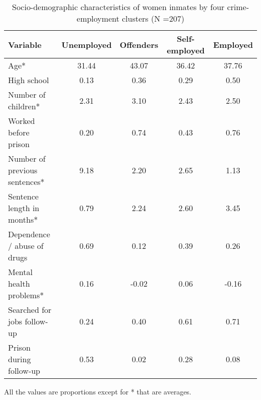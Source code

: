 \begin{table}[htp]
\footnotesize
\setlength{\tabcolsep}{10pt}
\renewcommand{\arraystretch}{1.3}
\begin{threeparttable}
\centering
\caption{Socio-demographic characteristics of women inmates \newline by four crime-employment clusters (N =207)} 
\label{tab:descriptives_job_crime_4}
\begin{tabular}{lcccc}
  \hline
Variable & Unemployed & Offenders & Self-employed & Employed \\ 
  \hline
Age* & 31.44 & 43.07 & 36.42 & 37.76 \\ 
  High school & 0.13 & 0.36 & 0.29 & 0.50 \\ 
  Number of children* & 2.31 & 3.10 & 2.43 & 2.50 \\ 
  Worked before prison & 0.20 & 0.74 & 0.43 & 0.76 \\ 
  Number of previous sentences* & 9.18 & 2.20 & 2.65 & 1.13 \\ 
  Sentence length in months* & 0.79 & 2.24 & 2.60 & 3.45 \\ 
  Dependence / abuse of drugs & 0.69 & 0.12 & 0.39 & 0.26 \\ 
  Mental health problems* & 0.16 & -0.02 & 0.06 & -0.16 \\ 
  Searched for jobs follow-up & 0.24 & 0.40 & 0.61 & 0.71 \\ 
  Prison during follow-up & 0.53 & 0.02 & 0.28 & 0.08 \\ 
   \hline
\end{tabular}
\begin{tablenotes}
\scriptsize
\item All the values are proportions except for * that are averages.
\end{tablenotes}
\end{threeparttable}
\end{table}
